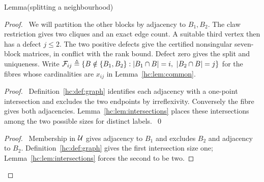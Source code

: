 \begin{mergedproofsection}
\begin{namedresult}{Lemma}{(splitting a neighbourhood)}\label{hc:lem:split}
 \leavevmode\par
\end{namedresult}
\begin{proof}
 \pfsketch\ We will partition the other blocks by adjacency to $B_1,B_2$.
 The claw restriction gives two cliques and an exact edge count.
 A suitable third vertex then has a defect $j\le2$. The two positive
 defects give the certified nonsingular seven-block matrices, in
 conflict with the rank bound. Defect zero gives the split and uniqueness.
 Write ${\mathcal F}_{ij}\triangleq\{B\notin\{B_1,B_2\}:
 |B_1\cap B|=i,\ |B_2\cap B|=j\}$ for the fibres whose
 cardinalities are $x_{ij}$ in Lemma~\ref{hc:lem:common}.
 \begin{proof}\pf\ Definition~\ref{hc:def:graph} identifies each
  adjacency with a one-point intersection and excludes the two
  endpoints by irreflexivity. Conversely the fibre gives both
  adjacencies. Lemma~\ref{hc:lem:intersections} places these
  intersections among the two possible sizes for distinct labels.~\qed\end{proof}
 \begin{proof}\pf\ Membership in ${\mathcal U}$ gives adjacency to $B_1$
  and excludes $B_2$ and adjacency to $B_2$.
  Definition~\ref{hc:def:graph} gives the first intersection size
  one; Lemma~\ref{hc:lem:intersections} forces the second to be two.

\end{proof}
\end{proof}
\end{mergedproofsection}
